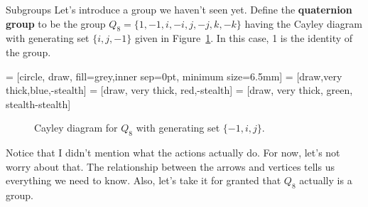 \begin{section}{Subgroups}
Let's introduce a group we haven't seen yet.  Define the \textbf{quaternion group} to be the group $Q_8=\{1,-1,i,-i,j,-j,k,-k\}$ having the Cayley diagram with generating set $\{i, j, -1\}$ given in Figure~\ref{fig:Q8}.  In this case, 1 is the identity of the group.

 = [circle, draw, fill=grey,inner sep=0pt, minimum size=6.5mm]
 = [draw,very thick,blue,-stealth]
 = [draw, very thick, red,-stealth]
 = [draw, very thick, green, stealth-stealth]

\begin{figure}[!ht]
\centering
{}
\caption{Cayley diagram for $Q_8$ with generating set $\{-1, i, j\}$.}\label{fig:Q8}
\end{figure}

Notice that I didn't mention what the actions actually do.  For now, let's not worry about that.  The relationship between the arrows and vertices tells us everything we need to know.  Also, let's take it for granted that $Q_8$ actually is a group.


\end{section}
